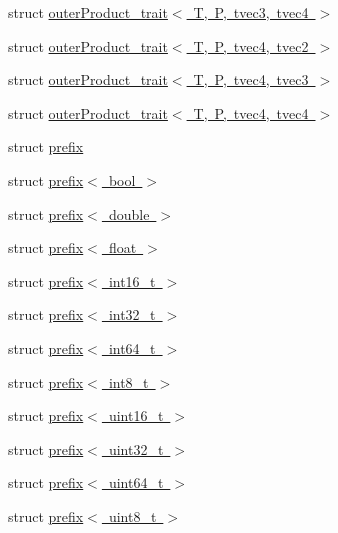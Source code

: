 \begin{DoxyCompactItemize}
\item 
struct \mbox{\hyperlink{structglm_1_1detail_1_1outer_product__trait_3_01_t_00_01_p_00_01tvec3_00_01tvec4_01_4}{outer\+Product\+\_\+trait$<$ T, P, tvec3, tvec4 $>$}}
\item 
struct \mbox{\hyperlink{structglm_1_1detail_1_1outer_product__trait_3_01_t_00_01_p_00_01tvec4_00_01tvec2_01_4}{outer\+Product\+\_\+trait$<$ T, P, tvec4, tvec2 $>$}}
\item 
struct \mbox{\hyperlink{structglm_1_1detail_1_1outer_product__trait_3_01_t_00_01_p_00_01tvec4_00_01tvec3_01_4}{outer\+Product\+\_\+trait$<$ T, P, tvec4, tvec3 $>$}}
\item 
struct \mbox{\hyperlink{structglm_1_1detail_1_1outer_product__trait_3_01_t_00_01_p_00_01tvec4_00_01tvec4_01_4}{outer\+Product\+\_\+trait$<$ T, P, tvec4, tvec4 $>$}}
\item 
struct \mbox{\hyperlink{structglm_1_1detail_1_1prefix}{prefix}}
\item 
struct \mbox{\hyperlink{structglm_1_1detail_1_1prefix_3_01bool_01_4}{prefix$<$ bool $>$}}
\item 
struct \mbox{\hyperlink{structglm_1_1detail_1_1prefix_3_01double_01_4}{prefix$<$ double $>$}}
\item 
struct \mbox{\hyperlink{structglm_1_1detail_1_1prefix_3_01float_01_4}{prefix$<$ float $>$}}
\item 
struct \mbox{\hyperlink{structglm_1_1detail_1_1prefix_3_01int16__t_01_4}{prefix$<$ int16\+\_\+t $>$}}
\item 
struct \mbox{\hyperlink{structglm_1_1detail_1_1prefix_3_01int32__t_01_4}{prefix$<$ int32\+\_\+t $>$}}
\item 
struct \mbox{\hyperlink{structglm_1_1detail_1_1prefix_3_01int64__t_01_4}{prefix$<$ int64\+\_\+t $>$}}
\item 
struct \mbox{\hyperlink{structglm_1_1detail_1_1prefix_3_01int8__t_01_4}{prefix$<$ int8\+\_\+t $>$}}
\item 
struct \mbox{\hyperlink{structglm_1_1detail_1_1prefix_3_01uint16__t_01_4}{prefix$<$ uint16\+\_\+t $>$}}
\item 
struct \mbox{\hyperlink{structglm_1_1detail_1_1prefix_3_01uint32__t_01_4}{prefix$<$ uint32\+\_\+t $>$}}
\item 
struct \mbox{\hyperlink{structglm_1_1detail_1_1prefix_3_01uint64__t_01_4}{prefix$<$ uint64\+\_\+t $>$}}
\item 
struct \mbox{\hyperlink{structglm_1_1detail_1_1prefix_3_01uint8__t_01_4}{prefix$<$ uint8\+\_\+t $>$}}
\item 

\end{DoxyCompactItemize}
